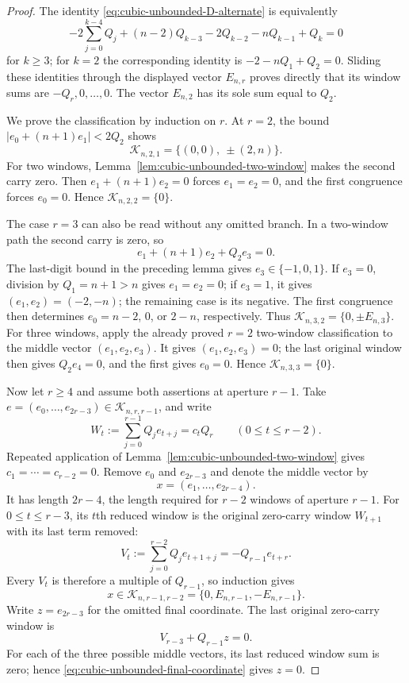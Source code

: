 \begin{proof}
The identity \eqref{eq:cubic-unbounded-D-alternate} is equivalently
\begin{equation}
-2\sum_{j=0}^{k-4}Q_j+(n-2)Q_{k-3}-2Q_{k-2}
-nQ_{k-1}+Q_k=0
\label{eq:cubic-unbounded-zero-word}
\end{equation}
for $k\ge3$; for $k=2$ the corresponding identity is
$-2-nQ_1+Q_2=0$.  Sliding these identities through the displayed vector
$E_{n,r}$ proves directly that its window sums are $-Q_r,0,\ldots,0$.
The vector $E_{n,2}$ has its sole sum equal to $Q_2$.

We prove the classification by induction on $r$.  At $r=2$, the bound
$|e_0+(n+1)e_1|<2Q_2$ shows
\[
\mathcal K_{n,2,1}=\{(0,0),\ \pm(2,n)\}.
\]
For two windows, Lemma~\ref{lem:cubic-unbounded-two-window} makes the
second carry zero.  Then $e_1+(n+1)e_2=0$ forces $e_1=e_2=0$, and the
first congruence forces $e_0=0$.  Hence
$\mathcal K_{n,2,2}=\{0\}$.

The case $r=3$ can also be read without any omitted branch.  In a
two-window path the second carry is zero, so
\[
e_1+(n+1)e_2+Q_2e_3=0.
\]
The last-digit bound in the preceding lemma gives
$e_3\in\{-1,0,1\}$.  If $e_3=0$, division by $Q_1=n+1>n$ gives
$e_1=e_2=0$; if $e_3=1$, it gives $(e_1,e_2)=(-2,-n)$; the remaining
case is its negative.  The first congruence then determines
$e_0=n-2$, $0$, or $2-n$, respectively.  Thus
$\mathcal K_{n,3,2}=\{0,\pm E_{n,3}\}$.  For three windows, apply the
already proved $r=2$ two-window classification to the middle vector
$(e_1,e_2,e_3)$.  It gives $(e_1,e_2,e_3)=0$; the last original window
then gives $Q_2e_4=0$, and the first gives $e_0=0$.  Hence
$\mathcal K_{n,3,3}=\{0\}$.

Now let $r\ge4$ and assume both assertions at aperture $r-1$.  Take
$e=(e_0,\ldots,e_{2r-3})\in\mathcal K_{n,r,r-1}$, and write
\begin{equation}
W_t:=\sum_{j=0}^{r-1}Q_je_{t+j}=c_tQ_r
\qquad(0\le t\le r-2).
\label{eq:cubic-unbounded-induction-windows}
\end{equation}
Repeated application of Lemma~\ref{lem:cubic-unbounded-two-window} gives
$c_1=\cdots=c_{r-2}=0$.  Remove $e_0$ and $e_{2r-3}$ and denote the
middle vector by
\[
x=(e_1,\ldots,e_{2r-4}).
\]
It has length $2r-4$, the length required for $r-2$ windows of aperture
$r-1$.  For $0\le t\le r-3$, its $t$th reduced window is the original
zero-carry window $W_{t+1}$ with its last term removed:
\begin{equation}
V_t:=\sum_{j=0}^{r-2}Q_je_{t+1+j}
=-Q_{r-1}e_{t+r}.
\label{eq:cubic-unbounded-reduced-window}
\end{equation}
Every $V_t$ is therefore a multiple of $Q_{r-1}$, so induction gives
\[
x\in\mathcal K_{n,r-1,r-2}
=\{0,E_{n,r-1},-E_{n,r-1}\}.
\]
Write $z=e_{2r-3}$ for the omitted final coordinate.  The last original
zero-carry window is
\begin{equation}
V_{r-3}+Q_{r-1}z=0.
\label{eq:cubic-unbounded-final-coordinate}
\end{equation}
For each of the three possible middle vectors, its last reduced window
sum is zero; hence \eqref{eq:cubic-unbounded-final-coordinate} gives
$z=0$.


\end{proof}
